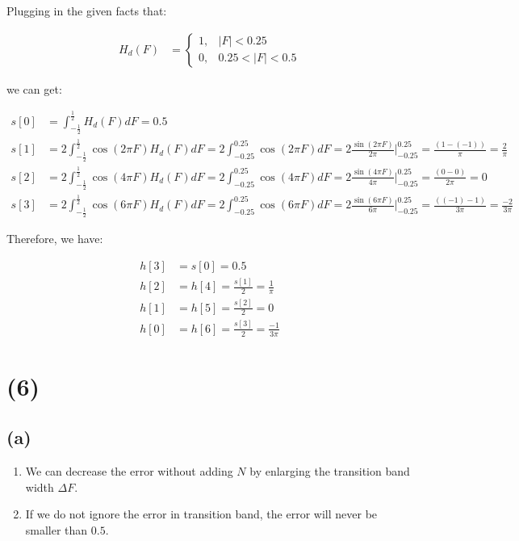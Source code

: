 \documentclass{article}
\begin{document}
Plugging in the given facts that:

\begin{align*}
    H_d(F) &= \begin{cases}
        1, & |F| < 0.25 \\
        0, & 0.25 < |F| < 0.5
    \end{cases} 
\end{align*}

we can get:

\begin{align*}
    s[0] &= \int^{\frac{1}{2}}_{-\frac{1}{2}} H_d(F) dF = 0.5 \\
    s[1] &= 2\int^{\frac{1}{2}}_{-\frac{1}{2}} \cos(2\pi F) H_d(F)dF = 2\int^{0.25}_{-0.25} \cos(2\pi F) dF = 2\frac{\sin(2\pi F)}{2\pi} \Big|^{0.25}_{-0.25} = \frac{(1-(-1))}{\pi} = \frac{2}{\pi} \\
    s[2] &= 2\int^{\frac{1}{2}}_{-\frac{1}{2}} \cos(4\pi F) H_d(F)dF = 2\int^{0.25}_{-0.25} \cos(4\pi F) dF = 2\frac{\sin(4\pi F)}{4\pi} \Big|^{0.25}_{-0.25} = \frac{(0-0)}{2\pi} = 0 \\
    s[3] &= 2\int^{\frac{1}{2}}_{-\frac{1}{2}} \cos(6\pi F) H_d(F)dF = 2\int^{0.25}_{-0.25} \cos(6\pi F) dF = 2\frac{\sin(6\pi F)}{6\pi} \Big|^{0.25}_{-0.25} = \frac{((-1)-1)}{3\pi} = \frac{-2}{3\pi}
\end{align*}

Therefore, we have:

\begin{align*}
    h[3] &= s[0] = 0.5 \\
    h[2] &= h[4] = \frac{s[1]}{2} = \frac{1}{\pi} \\
    h[1] &= h[5] = \frac{s[2]}{2} = 0 \\
    h[0] &= h[6] = \frac{s[3]}{2} = \frac{-1}{3\pi} 
\end{align*}

\section*{(6)}

\subsection*{(a)}

\begin{enumerate}
    \item We can decrease the error without adding $N$ by enlarging the transition band width $\Delta F$.
    \item If we do not ignore the error in transition band, the error will never be smaller than $0.5$.
\end{enumerate}
\end{document}
